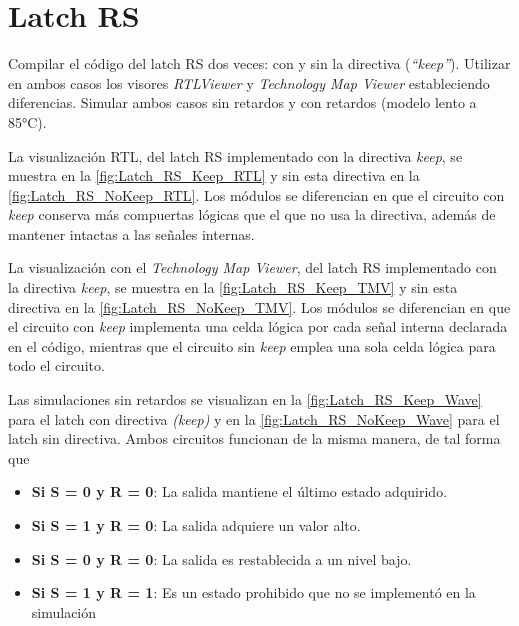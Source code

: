 \section{Latch RS \label{sec:s1}}

\begin{center}
	\begin{minipage}{12cm}
		\begin{tcolorbox}[title=Actividad 1]
			Compilar el código del latch RS dos veces: con y sin la directiva (\textit{``keep''}). Utilizar en ambos casos los visores \textit{RTLViewer} y \textit{Technology Map Viewer} estableciendo diferencias. Simular ambos casos sin retardos y con retardos (modelo lento a 85°C).
		\end{tcolorbox}	
	\end{minipage}
\end{center}

La visualización RTL, del latch RS implementado con la directiva \textit{keep}, se muestra en la \autoref{fig:Latch_RS_Keep_RTL} y sin esta directiva en la \autoref{fig:Latch_RS_NoKeep_RTL}. Los módulos se diferencian en que el circuito con \textit{keep} conserva más compuertas lógicas que el que no usa la directiva, además de mantener intactas a las señales internas.

La visualización con el \textit{Technology Map Viewer}, del latch RS implementado con la directiva \textit{keep}, se muestra en la \autoref{fig:Latch_RS_Keep_TMV} y sin esta directiva en la \autoref{fig:Latch_RS_NoKeep_TMV}. Los módulos se diferencian en que el circuito con \textit{keep} implementa una celda lógica por cada señal interna declarada en el código, mientras que el circuito sin \textit{keep} emplea una sola celda lógica para todo el circuito.

Las simulaciones sin retardos se visualizan en la \autoref{fig:Latch_RS_Keep_Wave} para el latch con directiva \textit{(keep)} y en la \autoref{fig:Latch_RS_NoKeep_Wave} para el latch sin directiva. Ambos circuitos funcionan de la misma manera, de tal forma que 

\begin{itemize}
	\item \textbf{Si S = 0 y R = 0}: La salida mantiene el último estado adquirido.
	\item \textbf{Si S = 1 y R = 0}: La salida adquiere un valor alto.
	\item \textbf{Si S = 0 y R = 0}: La salida es restablecida a un nivel bajo.
	\item \textbf{Si S = 1 y R = 1}: Es un estado prohibido que no se implementó en la simulación
\end{itemize}

